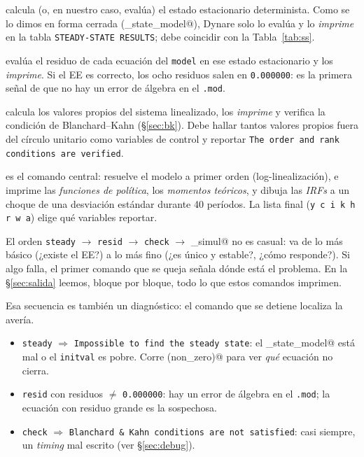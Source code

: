 \documentclass[11pt,a4paper]{report}
\newcounter{tcbrem}[section]
\renewcommand{\thetcbrem}{\thesection.\arabic{tcbrem}}
\newenvironment{remark}{%
  \refstepcounter{tcbrem}%
  \begin{tcolorbox}[remarkstyle, title={Observación~\thetcbrem}]}%
{\end{tcolorbox}}
\newenvironment{errorbox}[1][]{%
  \begin{tcolorbox}[errorstyle, title={\erroricon~~Error común%
    \ifx\relax#1\relax\else: #1\fi}]}%
{\end{tcolorbox}}
\newcommand{\code}[1]{\texttt{#1}}
\newcommand{\erroricon}{\raisebox{-0.5pt}{\begin{tikzpicture}[scale=0.11,baseline=-0.5ex]
  \draw[line width=2.4pt, line join=round] (0,1.9) -- (-1.1,-0.05) -- (1.1,-0.05) -- cycle;
  \draw[line width=2.2pt, line cap=round] (0,1.28) -- (0,0.58);
  \fill (0,0.28) circle (1.7pt);
\end{tikzpicture}}}
\begin{document}
\begin{description}[leftmargin=1.6em,style=nextline]
\item[\code{steady}] calcula (o, en nuestro caso, evalúa) el estado estacionario
  determinista. Como se lo dimos en forma cerrada
  (\lstinline@steady_state_model@), Dynare solo lo evalúa y lo \emph{imprime} en
  la tabla \texttt{STEADY-STATE RESULTS}; debe coincidir con la
  Tabla~\ref{tab:ss}.
\item[\code{resid}] evalúa el residuo de cada ecuación del \code{model} en ese
  estado estacionario y los \emph{imprime}. Si el EE es correcto, los ocho
  residuos salen en \texttt{0.000000}: es la primera señal de que no hay un error
  de álgebra en el \code{.mod}.
\item[\code{check}] calcula los valores propios del sistema linealizado, los
  \emph{imprime} y verifica la condición de Blanchard--Kahn (\S\ref{sec:bk}).
  Debe hallar tantos valores propios fuera del círculo unitario como variables de
  control y reportar \texttt{The order and rank conditions are verified}.
\item[\code{stoch\_simul(order=1, irf=40)}] es el comando central: resuelve el
  modelo a primer orden (log-linealización), e imprime las \emph{funciones de
  política}, los \emph{momentos teóricos}, y dibuja las \emph{IRFs} a un choque de
  una desviación estándar durante 40 períodos. La lista final
  (\code{y c i k h r w a}) elige qué variables reportar.
\end{description}

\begin{remark}
El orden \code{steady} $\to$ \code{resid} $\to$ \code{check} $\to$
\lstinline@stoch_simul@ no es casual: va de lo más básico (¿existe el EE?) a lo
más fino (¿es único y estable?, ¿cómo responde?). Si algo falla, el primer
comando que se queja señala dónde está el problema. En la \S\ref{sec:salida}
leemos, bloque por bloque, todo lo que estos comandos imprimen.
\end{remark}

\begin{errorbox}[cada comando falla a su manera]
Esa secuencia es también un diagnóstico: el comando que se detiene localiza la
avería.
\begin{itemize}[leftmargin=1.2em, topsep=2pt, itemsep=2pt]
\item \code{steady} $\Rightarrow$ \texttt{Impossible to find the steady state}:
  el \lstinline@steady_state_model@ está mal o el \code{initval} es pobre. Corre
  \lstinline@resid(non_zero)@ para ver \emph{qué} ecuación no cierra.
\item \code{resid} con residuos $\neq$ \texttt{0.000000}: hay un error de álgebra
  en el \code{.mod}; la ecuación con residuo grande es la sospechosa.
\item \code{check} $\Rightarrow$ \texttt{Blanchard \& Kahn conditions are not
  satisfied}: casi siempre, un \emph{timing} mal escrito (ver \S\ref{sec:debug}).
\end{itemize}
\end{errorbox}
\end{document}
